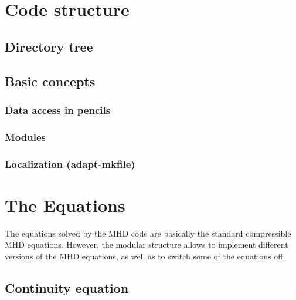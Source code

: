 \documentclass[12pt,twoside,notitlepage,a4paper]{article}
\begin{document}
\section{Code structure}


\subsection{Directory tree}



\subsection{Basic concepts}


\subsubsection{Data access in pencils}

\subsubsection{Modules}

\subsubsection{Localization (adapt-mkfile)}




\section{The Equations}

The equations solved by the MHD code are basically the standard
compressible MHD equations. However, the modular structure allows to
implement different versions of the MHD equations, as well as to switch
some of the equations off.


\subsection{Continuity equation}
\end{document}
